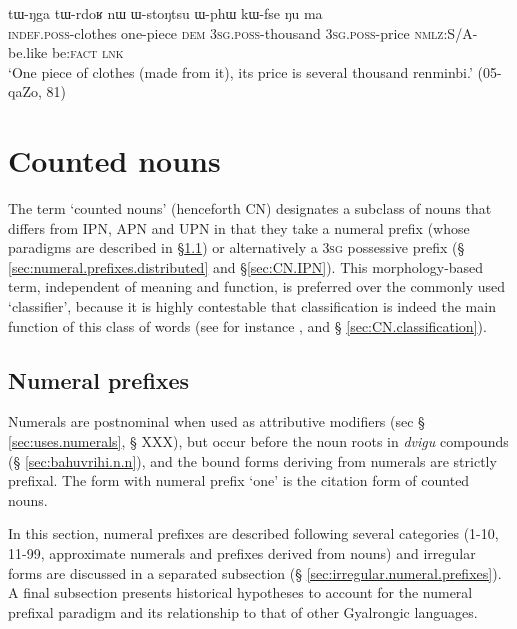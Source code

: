 \begin{exe}
\ex \label{ex:WstoNtsu}
\gll  tɯ-ŋga tɯ-rdoʁ nɯ ɯ-stoŋtsu ɯ-phɯ kɯ-fse ŋu ma \\
\textsc{indef.poss}-clothes one-piece \textsc{dem} \textsc{3sg.poss}-thousand \textsc{3sg.poss}-price \textsc{nmlz}:S/A-be.like be:\textsc{fact} \textsc{lnk} \\ 
\glt `One piece of clothes (made from it), its price is several thousand renminbi.' (05-qaZo, 81)
\end{exe}

\section{Counted nouns} \label{sec:counted.nouns}

The term `counted nouns' (henceforth CN) designates a subclass of nouns that differs from IPN, APN and UPN in that they take a numeral prefix (whose paradigms are described in §\ref{sec:numeral.prefixes}) or alternatively a \textsc{3sg} possessive prefix (§ \ref{sec:numeral.prefixes.distributed} and §\ref{sec:CN.IPN}). This morphology-based term, independent of meaning and function, is preferred over the commonly used  `classifier', because it is highly contestable that classification is indeed the main function of this class of words (see for instance \citealt{francois99classificateurs}, and § \ref{sec:CN.classification}).

\subsection{Numeral prefixes} \label{sec:numeral.prefixes}
Numerals are postnominal when used as attributive modifiers (sec § \ref{sec:uses.numerals}, § XXX), but occur before the noun roots in \textit{dvigu} compounds (§ \ref{sec:bahuvrihi.n.n}), and the bound forms deriving from numerals are strictly prefixal. The form with numeral prefix `one' is the citation form of counted nouns.

In this section, numeral prefixes are described following several categories (1-10, 11-99, approximate numerals and prefixes derived from nouns) and irregular forms are discussed in a separated subsection (§ \ref{sec:irregular.numeral.prefixes}). A final subsection presents historical hypotheses to account for the numeral prefixal paradigm and its relationship to that of other Gyalrongic languages.

